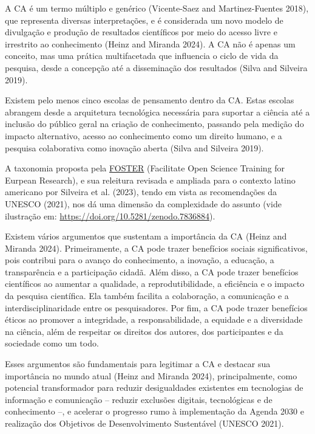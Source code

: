 \documentclass[
  a4paper,
]{article}
\begin{document}
A CA é um termo múltiplo e genérico (Vicente-Saez and Martinez-Fuentes
2018), que representa diversas interpretações, e é considerada um novo
modelo de divulgação e produção de resultados científicos por meio do
acesso livre e irrestrito ao conhecimento (Heinz and Miranda 2024). A CA
não é apenas um conceito, mas uma prática multifacetada que influencia o
ciclo de vida da pesquisa, desde a concepção até a disseminação dos
resultados (Silva and Silveira 2019).

Existem pelo menos cinco escolas de pensamento dentro da CA. Estas
escolas abrangem desde a arquitetura tecnológica necessária para
suportar a ciência até a inclusão do público geral na criação de
conhecimento, passando pela medição do impacto alternativo, acesso ao
conhecimento como um direito humano, e a pesquisa colaborativa como
inovação aberta (Silva and Silveira 2019).

A taxonomia proposta pela
\href{https://www.fosteropenscience.eu/foster-taxonomy/open-workflow-tools}{FOSTER}
(Facilitate Open Science Training for Eurpean Research), e sua releitura
revisada e ampliada para o contexto latino americano por Silveira et al.
(2023), tendo em vista as recomendações da UNESCO (2021), nos dá uma
dimensão da complexidade do assunto (vide ilustração em:
\url{https://doi.org/10.5281/zenodo.7836884}).

Existem vários argumentos que sustentam a importância da CA (Heinz and
Miranda 2024). Primeiramente, a CA pode trazer benefícios sociais
significativos, pois contribui para o avanço do conhecimento, a
inovação, a educação, a transparência e a participação cidadã. Além
disso, a CA pode trazer benefícios científicos ao aumentar a qualidade,
a reprodutibilidade, a eficiência e o impacto da pesquisa científica.
Ela também facilita a colaboração, a comunicação e a
interdisciplinaridade entre os pesquisadores. Por fim, a CA pode trazer
benefícios éticos ao promover a integridade, a responsabilidade, a
equidade e a diversidade na ciência, além de respeitar os direitos dos
autores, dos participantes e da sociedade como um todo.

Esses argumentos são fundamentais para legitimar a CA e destacar sua
importância no mundo atual (Heinz and Miranda 2024), principalmente,
como potencial transformador para reduzir desigualdades existentes em
tecnologias de informação e comunicação -- reduzir exclusões digitais,
tecnológicas e de conhecimento --, e acelerar o progresso rumo à
implementação da Agenda 2030 e realização dos Objetivos de
Desenvolvimento Sustentável (UNESCO 2021).
\end{document}
